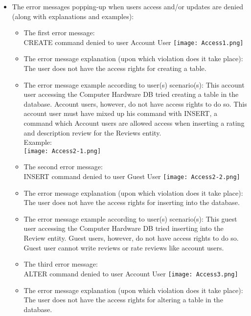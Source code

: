 {\begin{itemize}
\begin{itemize}
	   Lid
	 \end{itemize}
\item{}
	The error messages popping-up when users access and/or updates are denied (along with explanations and examples):
	\begin{itemize} 
	\item{The first error message: }
	\\CREATE command denied to user Account User
		\texttt{[image: Access1.png]}
	\item{The error message explanation (upon which violation does it take place): }
	The user does not have the access rights for creating a table. 
	\item{The error message example according to user(s) scenario(s): }
	This account user accessing the Computer Hardware DB tried creating a table in the database. Account users, however, do not have access rights to do so. This account user must have mixed up his command with INSERT, a command which Account users are allowed access when inserting a rating and description review for the Reviews entity.\\
	Example:\\
	\texttt{[image: Access2-1.png]}
	 \end{itemize}
	\begin{itemize} 
	\item{The second error message: }
	\\INSERT command denied to user Guest User
		\texttt{[image: Access2-2.png]}
	\item{The error message explanation (upon which violation does it take place): }
	The user does not have the access rights for inserting into the database. 
	\item{The error message example according to user(s) scenario(s): }
	This guest user accessing the Computer Hardware DB tried inserting into the Review entity. Guest users, however, do not have access rights to do so. Guest user cannot write reviews or rate reviews like account users.
	 \end{itemize}
	 \begin{itemize} 
	\item{The third error message: }
	\\ALTER command denied to user Account User
		\texttt{[image: Access3.png]}
	\item{The error message explanation (upon which violation does it take place): }
	The user does not have the access rights for altering a table in the database. 

\end{itemize}
\end{itemize}}
